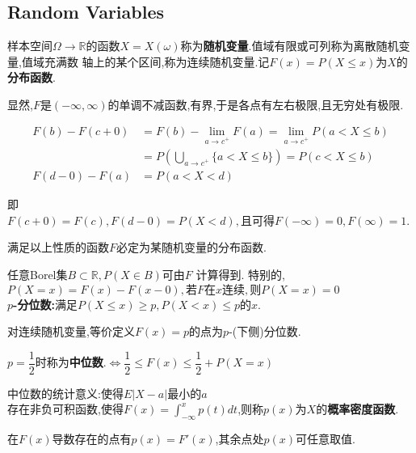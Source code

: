 \section{}
\subsection{Random Variables}
样本空间$ \Omega \rightarrow \mathbb{R}$的函数$ X = X(\omega)$称为\textbf{随机变量}.值域有限或可列称为离散随机变量,值域充满数
轴上的某个区间,称为连续随机变量.记$ F(x) = P(X \le x)$为$ X$的\textbf{分布函数}.

显然,$ F$是$ (-\infty, \infty)$的单调不减函数,有界,于是各点有左右极限,且无穷处有极限.

\begin{equation*}
	\begin{split}
		F(b) - F(c + 0) & = F(b) - \lim \limits_{a \to c^{+}} F(a) =\lim \limits_{a \to c^{+}}P(a < X \le b) \\
		                & = P(\bigcup_{a \to c^{+}}\{a < X \le b\}) = P(c < X \le b)                         \\
		F(d - 0) - F(a) & = P(a < X < d)
	\end{split}
\end{equation*}

即$ F(c + 0) = F(c), F(d - 0) = P(X<d), 且可得F(-\infty) = 0, F(\infty) = 1$.

满足以上性质的函数$ F$必定为某随机变量的分布函数.

任意Borel集$ B\subset \mathbb{R}, P(X \in B) 可由F$ 计算得到.
特别的,$ P(X=x) = F(x) - F(x - 0),若F在x连续,则P(X=x) = 0$
\\

\textbf{$p$-分位数:}满足$ P(X \le x) \ge p, P(X <x) \le p 的x. $

对连续随机变量,等价定义$F(x) = p$的点为$p$-(下侧)分位数.

$ p =\dfrac{1}{2}$时称为\textbf{中位数}.$\Leftrightarrow \dfrac{1}{2} \le F(x) \le \dfrac{1}{2} + P(X=x) $

中位数的统计意义:使得$E|X-a|$最小的$a$
\\

存在非负可积函数,使得$ F(x) = \int_{-\infty}^{x}{p(t)dt}$,则称$ p(x)$为$ X$的\textbf{概率密度函数}.

在$ F(x)$导数存在的点有$ p(x) = F'(x)$,其余点处$ p(x)$可任意取值.

